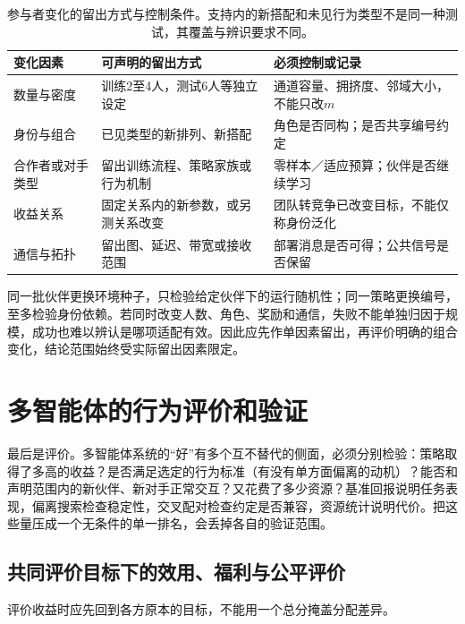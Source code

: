 \begin{table}[htbp]
 \centering
 \begin{tabularx}{\linewidth}{@{}l >{\raggedright\arraybackslash}X >{\raggedright\arraybackslash}X@{}}
 \toprule
 变化因素 & 可声明的留出方式 & 必须控制或记录\\
 \midrule
 数量与密度 & 训练2至4人，测试6人等独立设定 & 通道容量、拥挤度、邻域大小，不能只改$m$\\
 身份与组合 & 已见类型的新排列、新搭配 & 角色是否同构；是否共享编号约定\\
 合作者或对手类型 & 留出训练流程、策略家族或行为机制 & 零样本／适应预算；伙伴是否继续学习\\
 收益关系 & 固定关系内的新参数，或另测关系改变 & 团队转竞争已改变目标，不能仅称身份泛化\\
 通信与拓扑 & 留出图、延迟、带宽或接收范围 & 部署消息是否可得；公共信号是否保留\\
 \bottomrule
 \end{tabularx}
 \caption{参与者变化的留出方式与控制条件。支持内的新搭配和未见行为类型不是同一种测试，其覆盖与辨识要求不同。}
 \label{tab:rl-multi-agent-splits}
\end{table}

同一批伙伴更换环境种子，只检验给定伙伴下的运行随机性；同一策略更换编号，至多检验身份依赖。若同时改变人数、角色、奖励和通信，失败不能单独归因于规模，成功也难以辨认是哪项适配有效。因此应先作单因素留出，再评价明确的组合变化，结论范围始终受实际留出因素限定。

\section{多智能体的行为评价和验证}
\label{sec:rl-multi-agent-evaluation}

最后是评价。多智能体系统的“好”有多个互不替代的侧面，必须分别检验：策略取得了多高的收益？是否满足选定的行为标准（有没有单方面偏离的动机）？能否和声明范围内的新伙伴、新对手正常交互？又花费了多少资源？基准回报说明任务表现，偏离搜索检查稳定性，交叉配对检查约定是否兼容，资源统计说明代价。把这些量压成一个无条件的单一排名，会丢掉各自的验证范围。

\subsection{共同评价目标下的效用、福利与公平评价}
\label{sec:rl-multi-agent-welfare}

评价收益时应先回到各方原本的目标，不能用一个总分掩盖分配差异。

